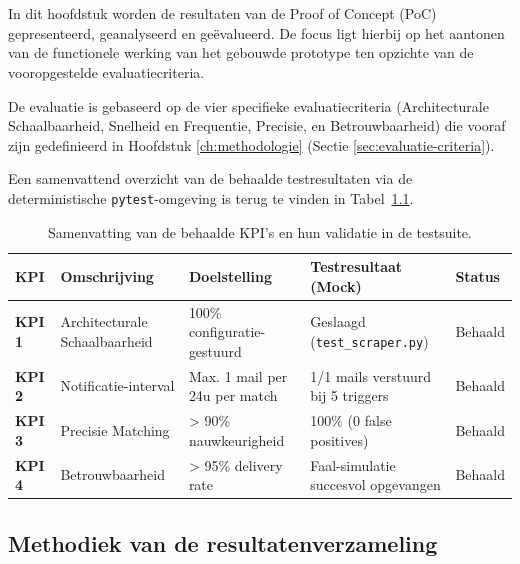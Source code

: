 \chapter{}%
\label{ch:resultaten-evaluatie}

In dit hoofdstuk worden de resultaten van de Proof of Concept (PoC) gepresenteerd, geanalyseerd en geëvalueerd. 
De focus ligt hierbij op het aantonen van de functionele werking van het gebouwde prototype ten opzichte van de vooropgestelde evaluatiecriteria.

De evaluatie is gebaseerd op de vier specifieke 
evaluatiecriteria (Architecturale Schaalbaarheid, Snelheid en 
Frequentie, Precisie, en Betrouwbaarheid) die vooraf zijn 
gedefinieerd in Hoofdstuk \ref{ch:methodologie} (Sectie \ref{sec:evaluatie-criteria}).

Een samenvattend overzicht van de behaalde testresultaten via de deterministische \texttt{pytest}-omgeving is terug te vinden in Tabel~\ref{tab:kpi-samenvatting}.

\begin{table}[h]
\centering
\renewcommand{\arraystretch}{1.3}
\begin{tabularx}{\textwidth}{@{}l X l X l@{}}
\toprule
\textbf{KPI} & \textbf{Omschrijving} & \textbf{Doelstelling} & \textbf{Testresultaat (Mock)} & \textbf{Status} \\
\midrule
\textbf{KPI 1} & Architecturale Schaalbaarheid & 100\% configuratie-gestuurd & Geslaagd (\texttt{test\_scraper.py}) & Behaald \\
\textbf{KPI 2} & Notificatie-interval & Max. 1 mail per 24u per match & 1/1 mails verstuurd bij 5 triggers & Behaald \\
\textbf{KPI 3} & Precisie Matching & > 90\% nauwkeurigheid & 100\% (0 false positives) & Behaald \\
\textbf{KPI 4} & Betrouwbaarheid & > 95\% delivery rate & Faal-simulatie succesvol opgevangen & Behaald \\
\bottomrule
\end{tabularx}
\caption{Samenvatting van de behaalde KPI's en hun validatie in de testsuite.}
\label{tab:kpi-samenvatting}
\end{table}

\section{Methodiek van de resultatenverzameling}
\label{sec:methodiek-resultaten}

